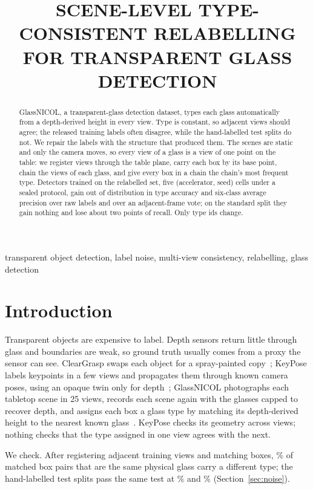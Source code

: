 \documentclass{article}
\title{SCENE-LEVEL TYPE-CONSISTENT RELABELLING FOR TRANSPARENT GLASS DETECTION}
\begin{document}
\ninept
\maketitle

\begin{abstract}
GlassNICOL, a transparent-glass detection dataset, types each glass automatically from a depth-derived height in every view. Type is constant, so adjacent views should agree; the released training labels often disagree, while the hand-labelled test splits do not. We repair the labels with the structure that produced them. The scenes are static and only the camera moves, so every view of a glass is a view of one point on the table: we register views through the table plane, carry each box by its base point, chain the views of each glass, and give every box in a chain the chain's most frequent type. Detectors trained on the relabelled set, five (accelerator, seed) cells under a sealed protocol, gain out of distribution in type accuracy and six-class average precision over raw labels and over an adjacent-frame vote; on the standard split they gain nothing and lose about two points of recall. Only type ids change.
\end{abstract}

\begin{keywords}
transparent object detection, label noise, multi-view consistency, relabelling, glass detection
\end{keywords}

\section{Introduction}
\label{sec:intro}
Transparent objects are expensive to label. Depth sensors return little through glass and boundaries are weak, so ground truth usually comes from a proxy the sensor can see. ClearGrasp swaps each object for a spray-painted copy~\cite{sajjan2020cleargrasp}; KeyPose labels keypoints in a few views and propagates them through known camera poses, using an opaque twin only for depth~\cite{liu2020keypose}; GlassNICOL photographs each tabletop scene in 25 views, records each scene again with the glasses capped to recover depth, and assigns each box a glass type by matching its depth-derived height to the nearest known glass~\cite{gajdosech2025glassnicol}. KeyPose checks its geometry across views; nothing checks that the type assigned in one view agrees with the next.

We check. After registering adjacent training views and matching boxes, \FlipRateReg\% of matched box pairs that are the same physical glass carry a different type; the hand-labelled test splits pass the same test at \ManStdFlipRate\% and \ManOODFlipRate\% (Section~\ref{sec:noise}).
\end{document}
